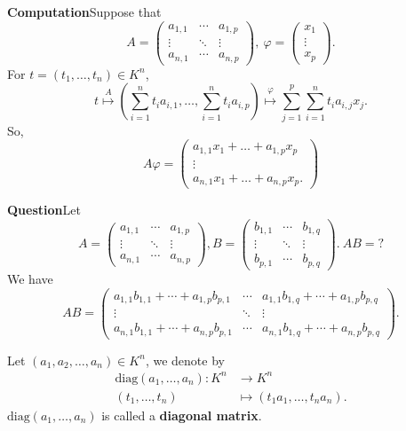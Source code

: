 \begin{box2}
\textbf{Computation}\quad Suppose that 
$$A=\begin{pmatrix}  
  a_{1,1} & \cdots & a_{1,p} \\  
  \vdots & \ddots & \vdots \\  
  a_{n,1} & \cdots & a_{n,p}  
\end{pmatrix} ,\ \varphi =\begin{pmatrix}
 x_1\\
 \vdots\\
x_p
\end{pmatrix}.$$
For $t=(t_1, \dots, t_n)\in K^n$, 
$$t\overset{A}{\longmapsto}\left(\sum_{i=1}^{n}t_ia_{i,1},\dots,\sum_{i=1}^{n}t_ia_{i,p} \right)\overset{\varphi}{\longmapsto}\sum_{j=1}^{p}\sum_{i=1}^{n}t_ia_{i,j}x_j.$$
So, 
$$A\varphi=\begin{pmatrix}
    a_{1,1}x_1+\dots+a_{1,p}x_p\\
    \vdots\\
    a_{n,1}x_1+\dots+a_{n,p}x_p.
\end{pmatrix}$$
\end{box2}
\begin{box2}
    \textbf{Question}\quad Let 
    $$A=\begin{pmatrix}  
  a_{1,1} & \cdots & a_{1,p} \\  
  \vdots & \ddots & \vdots \\  
  a_{n,1} & \cdots & a_{n,p}  
\end{pmatrix} ,B=\begin{pmatrix}  
  b_{1,1} & \cdots & b_{1,q} \\  
  \vdots & \ddots & \vdots \\  
  b_{p,1} & \cdots & b_{p,q}  
\end{pmatrix} . \ AB=? $$
    We have
    $$AB=\begin{pmatrix}  
  a_{1,1}b_{1,1}+\cdots+a_{1,p}b_{p,1} & \cdots & a_{1,1}b_{1,q}+\cdots+a_{1,p}b_{p,q} \\  
  \vdots & \ddots & \vdots \\  
  a_{n,1}b_{1,1}+\cdots+a_{n,p}b_{p,1} & \cdots & a_{n,1}b_{1,q}+\cdots+a_{n,p}b_{p,q}  
\end{pmatrix} .$$
\end{box2}
\begin{exampleenv}
    Let $(a_1,a_2,\dots,a_n)\in K^n$, we denote by 
    \begin{align*}
        \mathrm{diag}(a_1,\dots,a_n):K^n&\longrightarrow K^n\\
        (t_1,\dots,t_n)&\longmapsto(t_1a_1,\dots,t_na_n).
    \end{align*}
    $\mathrm{diag}(a_1,\dots,a_n)$ is called a \textbf{diagonal matrix}.
\end{exampleenv}
